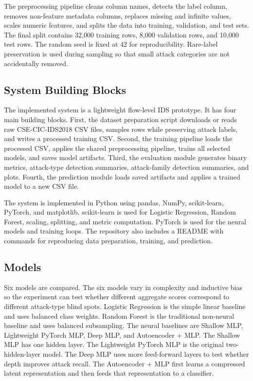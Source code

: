 \documentclass[sigconf,nonacm]{acmart}
\begin{document}
The preprocessing pipeline cleans column names, detects the label column, removes non-feature metadata columns, replaces missing and infinite values, scales numeric features, and splits the data into training, validation, and test sets.
The final split contains 32,000 training rows, 8,000 validation rows, and 10,000 test rows.
The random seed is fixed at 42 for reproducibility.
Rare-label preservation is used during sampling so that small attack categories are not accidentally removed.

\subsection{System Building Blocks}

The implemented system is a lightweight flow-level IDS prototype.
It has four main building blocks.
First, the dataset preparation script downloads or reads raw CSE-CIC-IDS2018 CSV files, samples rows while preserving attack labels, and writes a processed training CSV.
Second, the training pipeline loads the processed CSV, applies the shared preprocessing pipeline, trains all selected models, and saves model artifacts.
Third, the evaluation module generates binary metrics, attack-type detection summaries, attack-family detection summaries, and plots.
Fourth, the prediction module loads saved artifacts and applies a trained model to a new CSV file.

The system is implemented in Python using pandas, NumPy, scikit-learn, PyTorch, and matplotlib.
scikit-learn is used for Logistic Regression, Random Forest, scaling, splitting, and metric computation.
PyTorch is used for the neural models and training loops.
The repository also includes a README with commands for reproducing data preparation, training, and prediction.

\subsection{Models}

Six models are compared.
The six models vary in complexity and inductive bias so the experiment can test whether different aggregate scores correspond to different attack-type blind spots.
Logistic Regression is the simple linear baseline and uses balanced class weights.
Random Forest is the traditional non-neural baseline and uses balanced subsampling.
The neural baselines are Shallow MLP, Lightweight PyTorch MLP, Deep MLP, and Autoencoder + MLP.
The Shallow MLP has one hidden layer.
The Lightweight PyTorch MLP is the original two-hidden-layer model.
The Deep MLP uses more feed-forward layers to test whether depth improves attack recall.
The Autoencoder + MLP first learns a compressed latent representation and then feeds that representation to a classifier.
\end{document}

